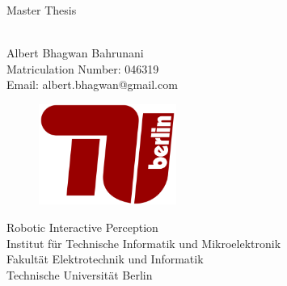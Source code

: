 \begin{titlepage}


\begin{center}
\vspace*{1cm}
\large{Master Thesis}
\\
\vspace*{1cm}
\textbf{\LARGE{\metaTitle}}\\
\normalsize

\vspace*{1cm}
\Large{Albert Bhagwan Bahrunani}
\\
\vspace*{1cm}
\large{Matriculation Number: 046319}
\\
\large{Email: albert.bhagwan@gmail.com}
\vspace*{1cm}

\begin{figure}[h]
	\centering
	\includegraphics[width=0.4\textwidth]{resources/images/TU-Berlin-Logo.png}
\end{figure}

\vspace*{1cm}
\large{Robotic Interactive Perception}
\\
\large{Institut für Technische Informatik und Mikroelektronik}
\\
\large{Fakultät Elektrotechnik und Informatik}
\\
\large{Technische Universität Berlin}
\\


\end{center}


\restoregeometry%
\end{titlepage}

